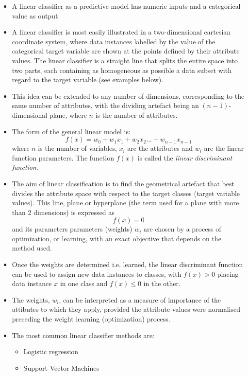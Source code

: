 \begin{itemize}
\item A linear classifier as a predictive model has numeric inputs and a categorical value as output
\item A linear classifier is most easily illustrated in a two-dimensional cartesian coordinate system, where data instances labelled by the value of the categorical target variable are shown at the points defined by their attribute values. The linear classifier is a straight line that splits the entire space into two parts, each containing as homogeneous as possible a data subset with regard to the target variable (see examples below).
\item This idea can be extended to any number of dimensions, corresponding to the same number of attributes, with the dividing artefact being an $(n-1)$-dimensional plane, where $n$ is the number of attributes.
\item The form of the general linear model is:
  $$ f(x) = w_0 + w_1 x_1 + w_2 x_2 ... + w_{n-1} x_{n-1} $$
  where $n$ is the number of variables, $x_i$ are the attributes and $w_i$ are the linear function parameters. The function $f(x)$ is called the \emph{linear discriminant function}.

\item The aim of linear classification is to find the geometrical artefact that best divides the attribute space with respect to the target classes (target variable values). This line, plane or hyperplane (the term used for a plane with more than 2 dimensions) is expressed as
  $$f(x) = 0$$
  and its parameters parameters (weights) $w_i$ are chosen by a process of optimization, or learning, with an exact objective that depends on the method used.
  \item Once the weights are determined i.e. learned, the linear discriminant function can be used to assign new data instances to classes, with $f(x)>0$ placing data instance $x$ in one class and $f(x)\leq0$ in the other. 
  \item The weights, $w_i$, can be interpreted as a measure of importance of the attibutes to which they apply, provided the attribute values were normalised preceding the weight learning (optimization) process.
  \item The most common linear classifier methods  are:
  \begin{itemize}
  \item Logistic regression
  \item Support Vector Machines
  \end{itemize}
\end{itemize}
\newpage


